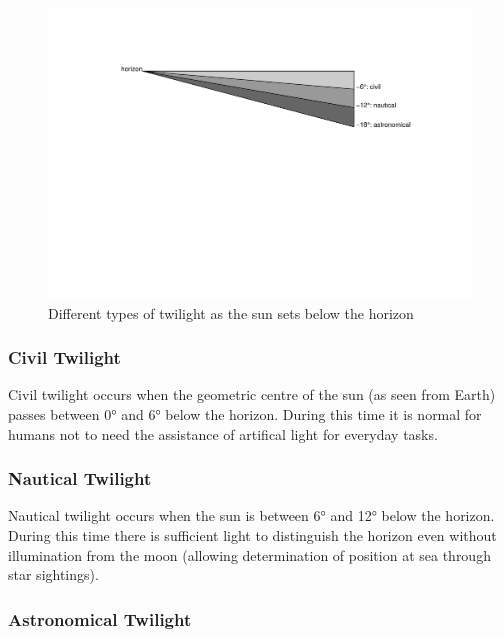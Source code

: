 \documentclass[
]{book}
\begin{document}
\begin{figure}

{\centering \includegraphics[width=0.9\linewidth]{_main_files/figure-latex/twilights-1} 

}

\caption{Different types of twilight as the sun sets below the horizon}\label{fig:twilights}
\end{figure}

\hypertarget{civil-twilight}{%
\subsubsection{Civil Twilight}\label{civil-twilight}}

Civil twilight occurs when the geometric centre of the sun (as seen from Earth) passes between 0° and 6° below the horizon. During this time it is normal for humans not to need the assistance of artifical light for everyday tasks.

\hypertarget{nautical-twilight}{%
\subsubsection{Nautical Twilight}\label{nautical-twilight}}

Nautical twilight occurs when the sun is between 6° and 12° below the horizon. During this time there is sufficient light to distinguish the horizon even without illumination from the moon (allowing determination of position at sea through star sightings).

\hypertarget{astronomical-twilight}{%
\subsubsection{Astronomical Twilight}\label{astronomical-twilight}}
\end{document}
